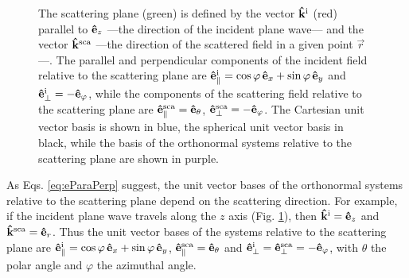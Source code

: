 \begin{figure}[!bht]\centering
	
    \caption[Scattering plane unit vector systems]{The scattering plane (green) is defined by the vector $\vu{k}^\text{i}$ (red) parallel to $\vu{e}_z$ ---the direction of the incident plane wave--- and the vector $\vu{k}^\text{sca}$ ---the direction of the scattered field in a given point $\vec{r}$---. The parallel and perpendicular components of the incident field relative to the scattering plane are $\vu{e}_\parallel^\text{i} = \cos\varphi\,\vu{e}_x +\sin\varphi\,\vu{e}_y$ and  $\vu{e}_\perp^\text{i} = -\vu{e}_\varphi$, while the components of the scattering field relative to the scattering plane are $\vu{e}_\parallel^\text{sca} = \vu{e}_\theta$, $\vu{e}_\perp^\text{sca} = - \vu{e}_\varphi$. The Cartesian unit vector basis is shown in blue, the spherical unit vector basis in black, while the basis of the orthonormal systems relative to the scattering plane are shown in purple. }
    \label{fig:ScatPlane}
\end{figure}
%
\noindent
As Eqs. \eqref{eq:eParaPerp} suggest, the unit vector bases of the orthonormal systems relative to the scattering plane depend on the scattering direction. For example, if the incident plane wave travels along the $z$ axis (Fig. \ref{fig:ScatPlane}), then $\vu{k}^\text{i} = \vu{e}_z$ and $\vu{k}^\text{sca} = \vu{e}_r$. Thus the unit vector bases of the systems relative to the scattering plane are   $\vu{e}_\parallel^\text{i} = \cos\varphi\, \vu{e}_x +\sin\varphi\, \vu{e}_y$, $\vu{e}_\parallel^\text{sca} = \vu{e}_\theta$ and $\vu{e}_\perp^\text{i} = \vu{e}_\perp^\text{sca}  = - \vu{e}_\varphi$, with $\theta$ the polar angle and $\varphi$ the azimuthal angle.

